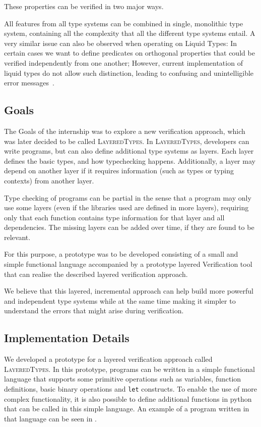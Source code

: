 \documentclass{easychair}
\newcommand{\LayeredTypes}{\textsc{LayeredTypes}}
\begin{document}
These properties can be verified in two major ways. 

All features from all type systems can be combined in single, monolithic type system, containing all the complexity that all the different type systems entail. A very similar issue can also be observed when operating on Liquid Types: In certain cases we want to define predicates on orthogonal properties that could be verified independently from one another; However, current implementation of liquid types do not allow such distinction, leading to confusing and unintelligible error messages~\cite{wits-error-messages}. 

\subsection{Goals}
\label{sec:proposed-approach}
The Goals of the internship was to explore a new verification approach, which was later decided to be called \LayeredTypes. In \LayeredTypes, developers can write programs, but can also define additional type systems as layers. Each layer defines the basic types, and how typechecking happens. Additionally, a layer may depend on another layer if it requires information (such as types or typing contexts) from another layer.

Type checking of programs can be partial in the sense that a program may only use some layers (even if the libraries used are defined in more layers), requiring only that each function contains type information for that layer and all dependencies. The missing layers can be added over time, if they are found to be relevant.

For this purpose, a prototype was to be developed consisting of a small and simple functional language accompanied by a prototype layered Verification tool that can realise the described layered verification approach.

We believe that this layered, incremental approach can help build more powerful and independent type systems while at the same time making it simpler to understand the errors that might arise during verification.

\subsection{Implementation Details}

We developed a prototype for a layered verification approach called \LayeredTypes. In this prototype, programs can be written in a simple functional language that supports some primitive operations such as variables, function definitions, basic binary operations and \texttt{let} constructs. To enable the use of more complex functionality, it is also possible to define additional functions in python that can be called in this simple language. An example of a program written in that language can be seen in .
\end{document}
